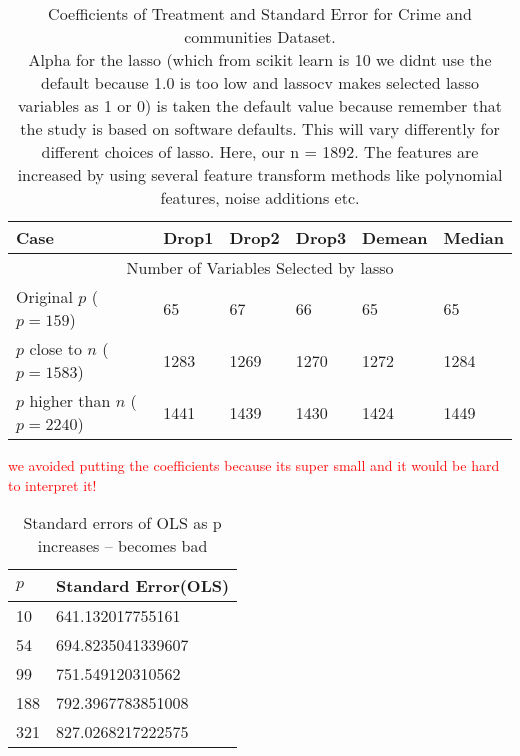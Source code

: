 \begin{table}[h!]
\renewcommand{\arraystretch}{1.5}
\centering
\begin{tabular}{||l l l l l l||} 
 \hline
 \hline
 Case & Drop1 & Drop2 & Drop3 & Demean & Median \\ [0.5ex] 
 \hline\hline 
 \multicolumn{6}{||c||}{Number of Variables Selected by lasso} \\ [0.5ex]
 Original $p$ ($p = 159$) & 65 & 67 & 66 & 65 & 65 \\ 
 $p$ close to $n$ ($p = 1583$) & 1283 & 1269 & 1270 & 1272 & 1284 \\
 $p$ higher than $n$ ($p= 2240$) & 1441 & 1439 & 1430 & 1424 & 1449 \\ [1ex] 
 \hline
\end{tabular}
\caption{Coefficients of Treatment and Standard Error for Crime and communities Dataset.  \\
Alpha for the lasso (which from scikit learn is 10 we didnt use the default because 1.0 is too low and lassocv makes selected lasso variables as 1 or 0) is taken the default value because remember that the study is based on software defaults. This will vary differently for different choices of lasso. Here, our n = 1892. The features are increased by using several feature transform methods like polynomial features, noise additions etc.  }
\textcolor{red}{we avoided putting the coefficients because its super small and it would be hard to interpret it!}
\label{table:1}
\end{table}




\begin{table}[h!]
\renewcommand{\arraystretch}{1.5}
\centering
\begin{tabular}{||l l||} 
 \hline
 \hline
 $p$ & Standard Error(OLS) \\ [0.5ex] 
 \hline\hline
 10 & 641.132017755161 \\ 
 54 & 694.8235041339607  \\
 99 & 751.549120310562 \\ 
 188 & 792.3967783851008 \\ 
 321 & 827.0268217222575 \\[1ex] 
 \hline
\end{tabular}
\caption{Standard errors of OLS as p increases -- becomes bad }
\label{table:1}
\end{table}


